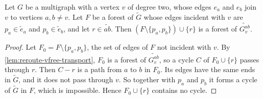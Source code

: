 \begin{lemma}
  \label{lem:reroute-cycle-lift}
  \leanok
  Let $G$ be a multigraph with a vertex $v$ of degree two, whose edges
  $e_a$ and $e_b$ join $v$ to vertices $a, b \neq v$. Let $F$ be a forest
  of $\tilde G$ whose edges incident with $v$ are $p_a \in \tilde e_a$ and
  $p_b \in \tilde e_b$, and let $r \in \widetilde{ab}$. Then
  $(F \setminus \{p_a, p_b\}) \cup \{r\}$ is a forest of
  $\widetilde{G_v^{ab}}$.
\end{lemma}
\begin{proof}
  \leanok
  Let $F_0 = F \setminus \{p_a, p_b\}$, the set of edges of $F$ not
  incident with $v$. By \cref{lem:reroute-vfree-transport}, $F_0$ is a
  forest of $\widetilde{G_v^{ab}}$, so a cycle $C$ of $F_0 \cup \{r\}$
  passes through $r$. Then $C - r$ is a path from $a$ to $b$ in $F_0$. Its
  edges have the same ends in $\tilde G$, and it does not pass through
  $v$. So together with $p_a$ and $p_b$ it forms a cycle of $\tilde G$ in
  $F$, which is impossible. Hence $F_0 \cup \{r\}$ contains no cycle.
\end{proof}

